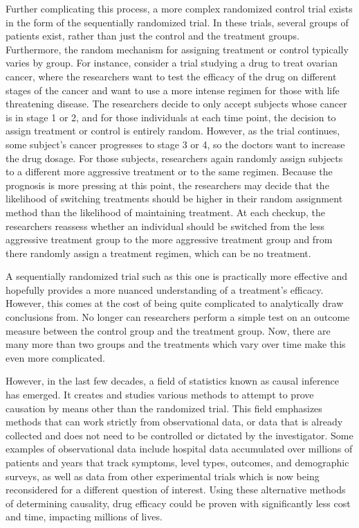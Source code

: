 Further complicating this process, a more complex randomized control trial exists in the form of the sequentially randomized trial.  In these trials, several groups of patients exist, rather than just the control and the treatment groups.  Furthermore, the random mechanism for assigning treatment or control typically varies by group.  For instance, consider a trial studying a drug to treat ovarian cancer, where the researchers want to test the efficacy of the drug on different stages of the cancer and want to use a more intense regimen for those with life threatening disease.  The researchers decide to only accept subjects whose cancer is in stage 1 or 2, and for those individuals at each time point, the decision to assign treatment or control is entirely random.  However, as the trial continues, some subject's cancer progresses to stage 3 or 4, so the doctors want to increase the drug dosage.  For those subjects, researchers again randomly assign subjects to a different more aggressive treatment or to the same regimen.  Because the prognosis is more pressing at this point, the researchers may decide that the likelihood of switching treatments should be higher in their random assignment method than the likelihood of maintaining treatment.  At each checkup, the researchers reassess whether an individual should be switched from the less aggressive treatment group to the more aggressive treatment group and from there randomly assign a treatment regimen, which can be no treatment.  

A sequentially randomized trial such as this one is practically more effective and hopefully provides a more nuanced understanding of a treatment's efficacy.  However, this comes at the cost of being quite complicated to analytically draw conclusions from.  No longer can researchers perform a simple test on an outcome measure between the control group and the treatment group.  Now, there are many more than two groups and the treatments which vary over time make this even more complicated.  
 
However, in the last few decades, a field of statistics known as causal inference has emerged.  It creates and studies various methods to attempt to prove causation by means other than the randomized trial.  This field emphasizes methods that can work strictly from observational data, or data that is already collected and does not need to be controlled or dictated by the investigator.  Some examples of observational data include hospital data accumulated over millions of patients and years that track symptoms, level types, outcomes, and demographic surveys, as well as data from other experimental trials which is now being reconsidered for a different question of interest.  Using these alternative methods of determining causality, drug efficacy could be proven with significantly less cost and time, impacting millions of lives.  

